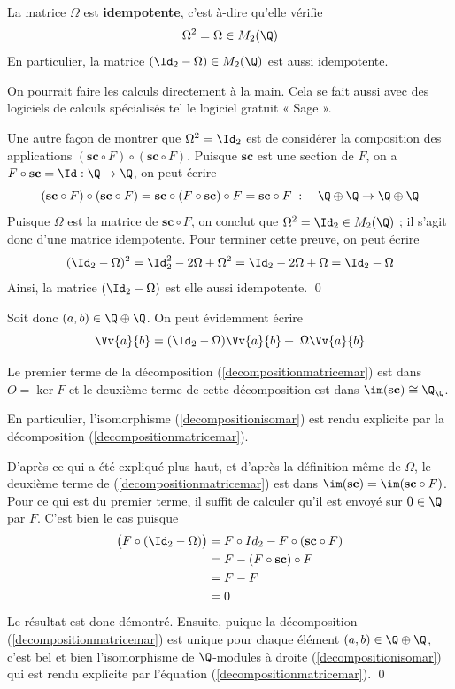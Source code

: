 \begin{Lem} La matrice $\Omega$ est \textbf{idempotente}, c'est à-dire qu'elle vérifie 
$$ \Omega^2 = \Omega \in M_2(\Q) $$
En particulier, la matrice $(\Id_2 - \Omega) \in M_2(\Q)$ est aussi idempotente.
\begin{pre} On pourrait faire les calculs directement à la main. Cela se fait aussi avec des logiciels de calculs spécialisés tel le logiciel gratuit « Sage ». 

Une autre façon de montrer que $\Omega^2 = \Id_2$ est de considérer la composition des applications $(\mathbf{sc} \circ F) \circ (\mathbf{sc} \circ F)$. Puisque $\mathbf{sc}$ est une section de $F$, on a $F \circ \mathbf{sc} = \Id : \Q \rightarrow \Q$, on peut écrire
$$ (\mathbf{sc} \circ F) \circ (\mathbf{sc} \circ F) = \mathbf{sc} \circ (F \circ \mathbf{sc}) \circ F = \mathbf{sc} \circ F \; : \quad \Q \oplus \Q \rightarrow \Q \oplus \Q $$ 
Puisque $\Omega$ est la matrice de $\mathbf{sc} \circ F$, on conclut que $\Omega^2 = \Id_2 \in M_2(\Q)$ ; il s'agit donc d'une matrice idempotente. Pour terminer cette preuve, on peut écrire
$$ (\Id_2 - \Omega)^2 = \Id_2^2 - 2\Omega + \Omega^2 = \Id_2 - 2\Omega + \Omega = \Id_2 - \Omega $$
Ainsi, la matrice $(\Id_2 - \Omega)$ est elle aussi idempotente.
\qed
\end{pre}
\end{Lem}

Soit donc $(a,b) \in \Q \oplus \Q$. On peut évidemment écrire
\begin{equation} \label{decompositionmatricemar}
\Vv{a}{b} = (\Id_2 - \Omega) \Vv{a}{b} + \; \Omega \Vv{a}{b}
\end{equation}

\begin{Lem} Le premier terme de la décomposition (\ref{decompositionmatricemar}) est dans $O = \ker F$ et le deuxième terme de cette décomposition est dans $\im (\mathbf{sc}) \cong \Q_\Q$.

En particulier, l'isomorphisme (\ref{decompositionisomar}) est rendu explicite par la décomposition (\ref{decompositionmatricemar}).
\begin{pre} D'après ce qui a été expliqué plus haut, et d'après la définition même de $\Omega$, le deuxième terme de (\ref{decompositionmatricemar}) est dans $\im (\mathbf{sc}) = \im (\mathbf{sc} \circ F)$.
Pour ce qui est du premier terme, il suffit de calculer qu'il est envoyé sur $0 \in \Q$ par $F$. C'est bien le cas puisque
\begin{align*}
\big(F \circ (\Id_2 - \Omega)\big) &= F \circ Id_2 - F \circ (\mathbf{sc} \circ F) \\
&= F - (F \circ \mathbf{sc}) \circ F\\
&= F - F\\
&= 0
\end{align*}
Le résultat est donc démontré. Ensuite, puique la décomposition (\ref{decompositionmatricemar}) est unique pour chaque élément $(a,b) \in \Q \oplus \Q$, c'est bel et bien l'isomorphisme de $\Q$-modules à droite (\ref{decompositionisomar}) qui est rendu explicite par l'équation (\ref{decompositionmatricemar}). \qed
\end{pre}
\end{Lem}

